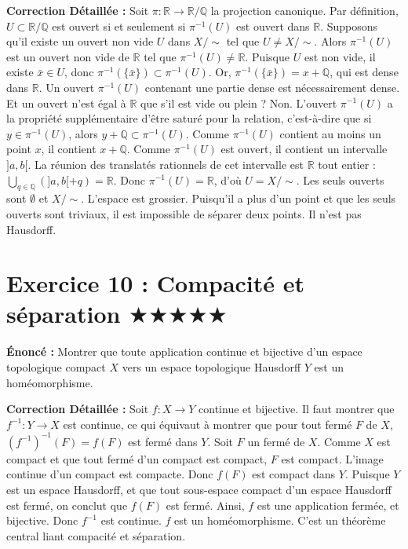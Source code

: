 \documentclass[11pt,a4paper]{article}
\begin{document}
\textbf{Correction Détaillée :}
Soit $\pi : \mathbb{R} \to \mathbb{R}/\mathbb{Q}$ la projection canonique. Par définition, $U \subset \mathbb{R}/\mathbb{Q}$ est ouvert si et seulement si $\pi^{-1}(U)$ est ouvert dans $\mathbb{R}$.
Supposons qu'il existe un ouvert non vide $U$ dans $X / \sim$ tel que $U \neq X / \sim$.
Alors $\pi^{-1}(U)$ est un ouvert non vide de $\mathbb{R}$ tel que $\pi^{-1}(U) \neq \mathbb{R}$.
Puisque $U$ est non vide, il existe $\bar{x} \in U$, donc $\pi^{-1}(\{\bar{x}\}) \subset \pi^{-1}(U)$.
Or, $\pi^{-1}(\{\bar{x}\}) = x + \mathbb{Q}$, qui est dense dans $\mathbb{R}$.
Un ouvert $\pi^{-1}(U)$ contenant une partie dense est nécessairement dense. Et un ouvert n'est égal à $\mathbb{R}$ que s'il est vide ou plein ? Non. L'ouvert $\pi^{-1}(U)$ a la propriété supplémentaire d'être saturé pour la relation, c'est-à-dire que si $y \in \pi^{-1}(U)$, alors $y + \mathbb{Q} \subset \pi^{-1}(U)$.
Comme $\pi^{-1}(U)$ contient au moins un point $x$, il contient $x + \mathbb{Q}$. Comme $\pi^{-1}(U)$ est ouvert, il contient un intervalle $]a, b[$. La réunion des translatés rationnels de cet intervalle est $\mathbb{R}$ tout entier : $\bigcup_{q \in \mathbb{Q}} (]a, b[ + q) = \mathbb{R}$.
Donc $\pi^{-1}(U) = \mathbb{R}$, d'où $U = X / \sim$.
Les seuls ouverts sont $\emptyset$ et $X / \sim$. L'espace est grossier.
Puisqu'il a plus d'un point et que les seuls ouverts sont triviaux, il est impossible de séparer deux points. Il n'est pas Hausdorff.





\section{Exercice 10 : Compacité et séparation \quad $\bigstar\bigstar\bigstar\bigstar\bigstar$}


\textbf{Énoncé :}
Montrer que toute application continue et bijective d'un espace topologique compact $X$ vers un espace topologique Hausdorff $Y$ est un homéomorphisme.

\textbf{Correction Détaillée :}
Soit $f : X \to Y$ continue et bijective. Il faut montrer que $f^{-1} : Y \to X$ est continue, ce qui équivaut à montrer que pour tout fermé $F$ de $X$, $(f^{-1})^{-1}(F) = f(F)$ est fermé dans $Y$.
Soit $F$ un fermé de $X$. Comme $X$ est compact et que tout fermé d'un compact est compact, $F$ est compact.
L'image continue d'un compact est compacte. Donc $f(F)$ est compact dans $Y$.
Puisque $Y$ est un espace Hausdorff, et que tout sous-espace compact d'un espace Hausdorff est fermé, on conclut que $f(F)$ est fermé.
Ainsi, $f$ est une application fermée, et bijective. Donc $f^{-1}$ est continue. $f$ est un homéomorphisme.
C'est un théorème central liant compacité et séparation.
\end{document}

